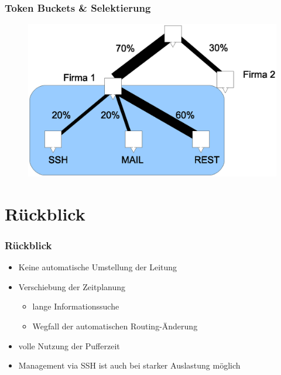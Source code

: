 \documentclass[14pt]{beamer}
\begin{document}
\begin{frame}
\frametitle{Token Buckets \& Selektierung}
\begin{figure}[h!]
      \includegraphics[width=1\textwidth]{GFX/bucket-hiracy-menge_combined}
  \end{figure}
\end{frame}


\section{Rückblick}
\begin{frame}
\frametitle{Rückblick}
\begin{itemize}
  \item Keine automatische Umstellung der Leitung
  \item Verschiebung der Zeitplanung
\begin{itemize}
 \item lange Informationssuche
 \item Wegfall der automatischen Routing-Änderung
\end{itemize}
  \item volle Nutzung der Pufferzeit
  \item Management via SSH ist auch bei starker Auslastung möglich
\end{itemize}
\end{frame}
\end{document}
